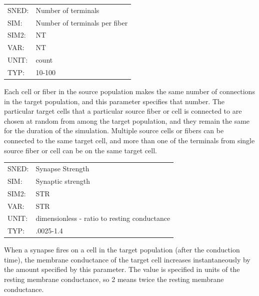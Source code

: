 \documentclass[12pt,openany,oneside]{book}
\begin{document}
\begin{flushleft}
\begin{tabular}{@{}ll@{}}
SNED: & Number of terminals\\
SIM: & Number of terminals per fiber\\
SIM2: & NT\\
VAR: & NT\\
UNIT: & count\\
TYP: & 10-100\\
\end{tabular}
\end{flushleft}
\noindent
Each cell or fiber in the source population makes the same number of
connections in the target population, and this parameter specifies
that number.  The particular target cells that a particular source
fiber or cell is connected to are chosen at random from among the
target population, and they remain the same for the duration of the
simulation.  Multiple source cells or fibers can be connected to the
same target cell, and more than one of the terminals from single
source fiber or cell can be on the same target cell.
\filbreak
\vspace{\baselineskip}

\begin{flushleft}
\begin{tabular}{@{}ll@{}}
SNED: & Synapse Strength\\
SIM: & Synaptic strength\\
SIM2: & STR\\
VAR: & STR\\
UNIT: & dimensionless - ratio to resting conductance\\
TYP: & .0025-1.4\\
\end{tabular}
\end{flushleft}
\noindent
When a synapse fires on a cell in the target population (after the
conduction time), the membrane conductance of the target cell
increases instantaneously by the amount specified by this parameter.
The value is specified in units of the resting membrane conductance,
so 2 means twice the resting membrane conductance.
\filbreak
\vspace{\baselineskip}
\end{document}
